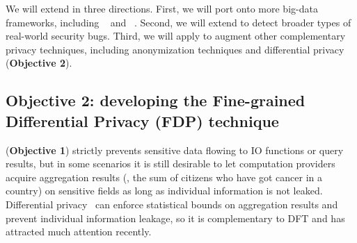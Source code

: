 



 We will extend \kakute in 
three directions. First, we will port \kakute onto more big-data frameworks, 
including \pig~\cite{pig:vldb08} and \hadoop~\cite{hadoop}. Second, we will 
extend \kakute to detect broader types of real-world security bugs. Third, we 
will apply \kakute to augment other complementary privacy techniques, including 
anonymization techniques and differential privacy (\textbf{Objective 2}). 

\vspace{-.15in}\subsection{Objective 2: developing the Fine-grained 
Differential Privacy (FDP) technique}\label{sec:obj2}\vspace{-.075in}



\kakute (\textbf{Objective 1}) strictly prevents
sensitive data flowing to IO functions or query results, but in some scenarios 
it is still desirable to let computation providers acquire aggregation 
results (\eg, the sum of citizens who have got cancer in a country) 
on sensitive fields as long as individual information is not leaked. 
Differential privacy~\cite{Dwork2006Differential} can enforce statistical 
bounds on 
aggregation results and prevent individual information leakage, so it is 
complementary to DFT and has attracted much attention recently.


